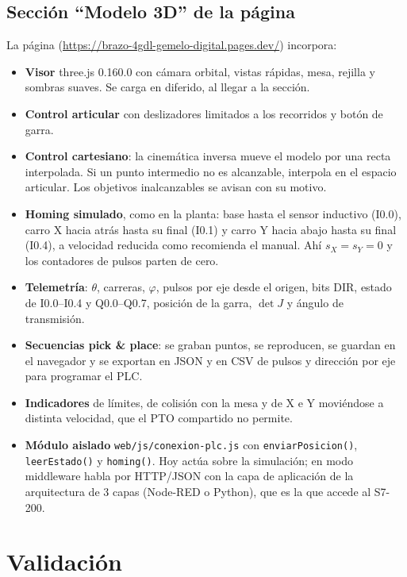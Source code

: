 \documentclass[a4paper,12pt]{article}
\newcommand{\codigo}[1]{\texttt{\small #1}}
\begin{document}
\subsection{Sección ``Modelo 3D'' de la página}
La página (\url{https://brazo-4gdl-gemelo-digital.pages.dev/}) incorpora:
\begin{itemize}
\item \textbf{Visor} three.js 0.160.0 con cámara orbital, vistas rápidas, mesa, rejilla y sombras suaves.
      Se carga en diferido, al llegar a la sección.
\item \textbf{Control articular} con deslizadores limitados a los recorridos y botón de garra.
\item \textbf{Control cartesiano}: la cinemática inversa mueve el modelo por una recta interpolada. Si un
      punto intermedio no es alcanzable, interpola en el espacio articular. Los objetivos inalcanzables se
      avisan con su motivo.
\item \textbf{Homing simulado}, como en la planta: base hasta el sensor inductivo (I0.0), carro X hacia atrás
      hasta su final (I0.1) y carro Y hacia abajo hasta su final (I0.4), a velocidad reducida como recomienda
      el manual. Ahí $s_X = s_Y = 0$ y los contadores de pulsos parten de cero.
\item \textbf{Telemetría}: $\theta$, carreras, $\varphi$, pulsos por eje desde el origen, bits DIR, estado de
      I0.0--I0.4 y Q0.0--Q0.7, posición de la garra, $\det J$ y ángulo de transmisión.
\item \textbf{Secuencias pick \& place}: se graban puntos, se reproducen, se guardan en el navegador y se
      exportan en JSON y en CSV de pulsos y dirección por eje para programar el PLC.
\item \textbf{Indicadores} de límites, de colisión con la mesa y de X e Y moviéndose a distinta velocidad,
      que el PTO compartido no permite.
\item \textbf{Módulo aislado} \codigo{web/js/conexion-plc.js} con \codigo{enviarPosicion()},
      \codigo{leerEstado()} y \codigo{homing()}. Hoy actúa sobre la simulación; en modo middleware habla
      por HTTP/JSON con la capa de aplicación de la arquitectura de 3 capas (Node-RED o Python), que es la
      que accede al S7-200.
\end{itemize}

\section{Validación}
\end{document}
